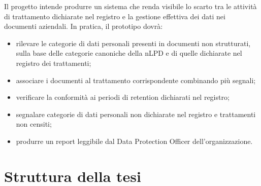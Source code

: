 Il progetto intende produrre un sistema che renda visibile lo scarto tra le attività di trattamento dichiarate nel registro e la gestione effettiva dei dati nei documenti aziendali. In pratica, il prototipo dovrà:
\begin{itemize}
	\item rilevare le categorie di dati personali presenti in documenti non strutturati, sulla base delle categorie canoniche della nLPD e di quelle dichiarate nel registro dei trattamenti;
	\item associare i documenti al trattamento corrispondente combinando più segnali;
	\item verificare la conformità ai periodi di retention dichiarati nel registro;
	\item segnalare categorie di dati personali non dichiarate nel registro e trattamenti non censiti;
	\item produrre un report leggibile dal Data Protection Officer dell'organizzazione.
\end{itemize}

\section{Struttura della tesi}


